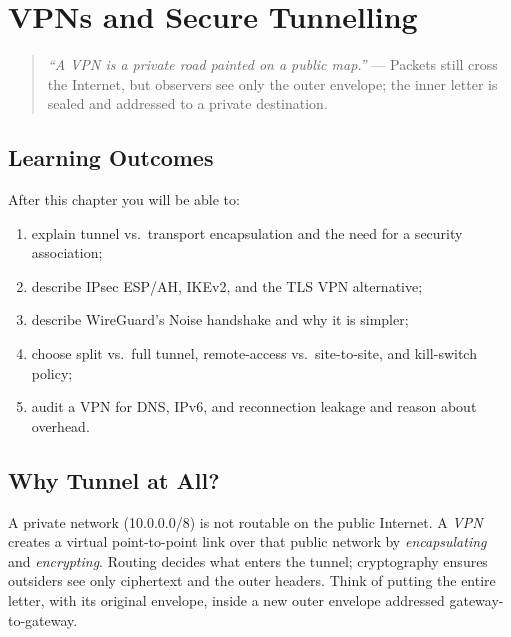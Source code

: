 \chapter{VPNs and Secure Tunnelling}\label{ch:vpn}
\sloppy

\begin{quote}
\emph{``A VPN is a private road painted on a public map.''} --- Packets still
cross the Internet, but observers see only the outer envelope; the inner letter
is sealed and addressed to a private destination.
\end{quote}

\noindent{}
\vspace{0.4em}

\section*{Learning Outcomes}
After this chapter you will be able to:
\begin{enumerate}[label=(L\arabic*)]
    \item explain tunnel vs.\ transport encapsulation and the need for a security association;
    \item describe IPsec ESP/AH, IKEv2, and the TLS VPN alternative;
    \item describe WireGuard's Noise handshake and why it is simpler;
    \item choose split vs.\ full tunnel, remote-access vs.\ site-to-site, and kill-switch policy;
    \item audit a VPN for DNS, IPv6, and reconnection leakage and reason about overhead.
\end{enumerate}

\section{Why Tunnel at All?}\label{sec:why-tunnel}
A private network (10.0.0.0/8) is not routable on the public Internet. A
\emph{VPN} creates a virtual point-to-point link over that public network by
\emph{encapsulating} and \emph{encrypting}. Routing decides what enters the
tunnel; cryptography ensures outsiders see only ciphertext and the outer
headers. Think of putting the entire letter, with its original envelope,
inside a new outer envelope addressed gateway-to-gateway.

